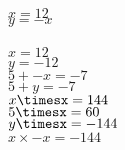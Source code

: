 \documentclass{article}
\begin{document}
$x=12$\\
$y=-x$\\
\\$x=12$\\
$y=-12$\\
$5+-x=-7$\\
$5+y=-7$\\
$x\timesx=144$\\
$5\timesx=60$\\
$y\timesx=-144$\\
$x\times-x=-144$\\
\end{document}
